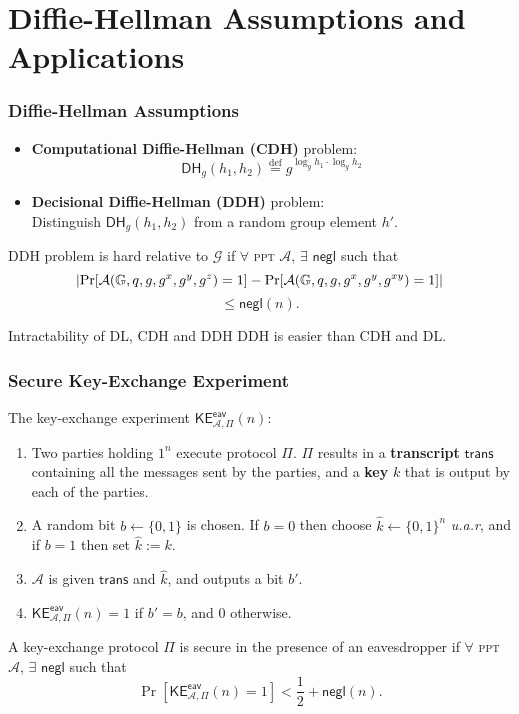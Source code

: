 \section{Diffie-Hellman Assumptions and Applications}
\begin{frame}\frametitle{Diffie-Hellman Assumptions}
\begin{itemize}
\item \textbf{Computational Diffie-Hellman (CDH)} problem:
\[ \mathsf{DH}_g(h_1,h_2) \overset{\text{def}}{=} g^{\log_gh_1\cdot \log_gh_2}\]
\item \textbf{Decisional Diffie-Hellman (DDH)} problem:	\\
Distinguish $\mathsf{DH}_g(h_1,h_2)$ from a random group element $h'$.
\end{itemize}
\begin{definition}
DDH problem is hard relative to $\mathcal{G}$ if $\forall$ \textsc{ppt} $\mathcal{A}$, $\exists$ $\mathsf{negl}$ such that
\[  \lvert\Pr[\mathcal{A}(\mathbb{G},q,g,g^x,g^y,g^z)=1] - \Pr[\mathcal{A}(\mathbb{G},q,g,g^x,g^y,g^{xy})=1]\rvert\]
\[ \le \mathsf{negl}(n). \]
\end{definition}
\begin{alertblock}{Intractability of DL, CDH and DDH}
DDH is easier than CDH and DL.
\end{alertblock}
\end{frame}
\begin{frame}\frametitle{Secure Key-Exchange Experiment}
The key-exchange experiment $\mathsf{KE}^{\mathsf{eav}}_{\mathcal{A},\Pi}(n)$:
\begin{enumerate}
\item Two parties holding $1^n$ execute protocol $\Pi$. $\Pi$ results in a \textbf{transcript} $\mathsf{trans}$ containing all the messages sent by the parties, and a \textbf{key} $k$ that is output by each of the parties.
\item A random bit $b \gets \{0,1\}$ is chosen. If $b=0$ then choose $\hat{k} \gets \{0,1\}^n$ \emph{u.a.r}, and if $b=1$ then set $\hat{k} :=k$.
\item $\mathcal{A}$ is given $\mathsf{trans}$ and $\hat{k}$, and outputs a bit $b'$.
\item $\mathsf{KE}^{\mathsf{eav}}_{\mathcal{A},\Pi}(n)=1$ if $b'=b$, and 0 otherwise. 
\end{enumerate}
\begin{definition}
A key-exchange protocol $\Pi$ is secure in the presence of an eavesdropper if $\forall$ \textsc{ppt} $\mathcal{A}$, $\exists$ $\mathsf{negl}$ such that
\[ \Pr[\mathsf{KE}^{\mathsf{eav}}_{\mathcal{A},\Pi}(n) = 1] < \frac{1}{2} + \mathsf{negl}(n). \]
\end{definition}
\end{frame}
